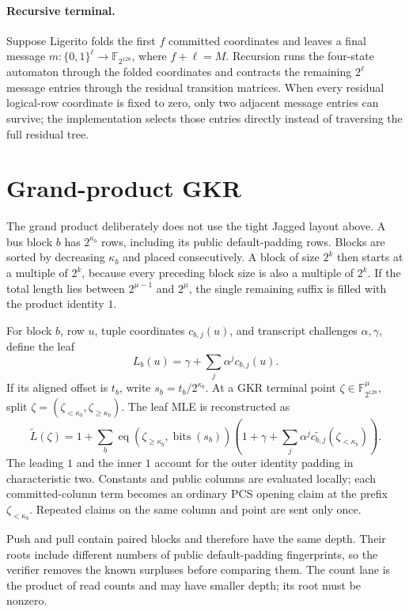 \documentclass[11pt]{article}
\newcommand{\F}{\mathbb F_{2^{128}}}
\newcommand{\cube}[1]{\{0,1\}^{#1}}
\newcommand{\eq}{\operatorname{eq}}
\newcommand{\mle}[1]{\widetilde{#1}}
\newcommand{\bits}{\operatorname{bits}}
\begin{document}
\paragraph{Recursive terminal.} Suppose Ligerito folds the first $f$ committed coordinates and leaves a final message $m:\cube\ell\to\F$, where $f+\ell=M$. Recursion runs the four-state automaton through the folded coordinates and contracts the remaining $2^\ell$ message entries through the residual transition matrices. When every residual logical-row coordinate is fixed to zero, only two adjacent message entries can survive; the implementation selects those entries directly instead of traversing the full residual tree.

\section{Grand-product GKR}

The grand product deliberately does not use the tight Jagged layout above. A bus block $b$ has $2^{\kappa_b}$ rows, including its public default-padding rows. Blocks are sorted by decreasing $\kappa_b$ and placed consecutively. A block of size $2^k$ then starts at a multiple of $2^k$, because every preceding block size is also a multiple of $2^k$. If the total length lies between $2^{\mu-1}$ and $2^\mu$, the single remaining suffix is filled with the product identity $1$.

For block $b$, row $u$, tuple coordinates $c_{b,j}(u)$, and transcript challenges $\alpha,\gamma$, define the leaf
\[
L_b(u)=\gamma+\sum_j\alpha^jc_{b,j}(u).
\]
If its aligned offset is $t_b$, write $s_b=t_b/2^{\kappa_b}$. At a GKR terminal point $\zeta\in\F^\mu$, split $\zeta=(\zeta_{<\kappa_b},\zeta_{\geq\kappa_b})$. The leaf MLE is reconstructed as
\[
\mle L(\zeta)=1+\sum_b\eq\!\left(\zeta_{\geq\kappa_b},\bits(s_b)\right)\left(1+\gamma+\sum_j\alpha^j\mle{c_{b,j}}(\zeta_{<\kappa_b})\right).
\]
The leading $1$ and the inner $1$ account for the outer identity padding in characteristic two. Constants and public columns are evaluated locally; each committed-column term becomes an ordinary PCS opening claim at the prefix $\zeta_{<\kappa_b}$. Repeated claims on the same column and point are sent only once.

Push and pull contain paired blocks and therefore have the same depth. Their roots include different numbers of public default-padding fingerprints, so the verifier removes the known surpluses before comparing them. The count lane is the product of read counts and may have smaller depth; its root must be nonzero.
\end{document}
